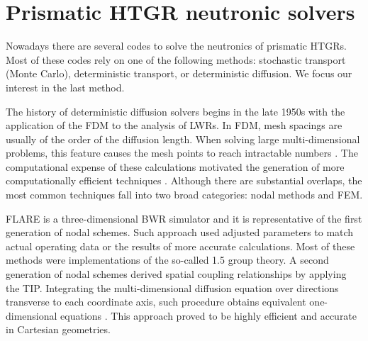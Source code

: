 \documentclass[11pt,letterpaper]{article}
\begin{document}
\section{Prismatic \gls{HTGR} neutronic solvers}

Nowadays there are several codes to solve the neutronics of prismatic \glspl{HTGR}.
Most of these codes rely on one of the following methods: stochastic transport (Monte Carlo), deterministic transport, or deterministic diffusion.
We focus our interest in the last method.

The history of deterministic diffusion solvers begins in the late 1950s with the application of the \gls{FDM} to the analysis of \glspl{LWR}.
In \gls{FDM}, mesh spacings are usually of the order of the diffusion length.
When solving large multi-dimensional problems, this feature causes the mesh points to reach intractable numbers \cite{lewis_finite_1986}.
The computational expense of these calculations motivated the generation of more computationally efficient techniques \cite{lawrence_progress_1986}.
Although there are substantial overlaps, the most common techniques fall into two broad categories: nodal methods and \gls{FEM}.

FLARE \cite{delp_flare_1964} is a three-dimensional \gls{BWR} simulator and it is representative of the first generation of nodal schemes.
Such approach used adjusted parameters to match actual operating data or the results of more accurate calculations.
Most of these methods were implementations of the so-called 1.5 group theory.
A second generation of nodal schemes derived spatial coupling relationships by applying the \gls{TIP}.
Integrating the multi-dimensional diffusion equation over directions transverse to each coordinate axis, such procedure obtains equivalent one-dimensional equations \cite{lawrence_progress_1986}.
This approach proved to be highly efficient and accurate in Cartesian geometries.
\end{document}
